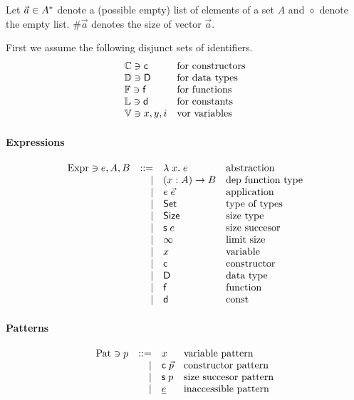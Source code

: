 Let $\vec{a} \in {A}^{\ast} $ denote a (possible empty) list of elements of a set $A$
and $\diamond$ denote the empty list. $\#\vec{a}$ denotes the size of vector $\vec{a}$.

First we assume the following disjunct sets of identifiers.
\[
\begin{array}{ll}
\mathbb{C} \ni \mathsf{c} & \mbox{for constructors}\\
\mathbb{D} \ni \mathsf{D} & \mbox{for data types}\\
\mathbb{F} \ni \mathsf{f} & \mbox{for functions}\\
\mathbb{L} \ni \mathsf{d} & \mbox{for constants}\\
\mathbb{V} \ni x,y,i & \mbox{vor variables}
\end{array}
\]

\paragraph*{Expressions}
\[
\begin{array}{lrll}
\mathrm{Expr} \ni e,A,B & ::= & \lambda\; x .\;{e} & \mbox{abstraction}\\
& \mid & ( x : A ) \rightarrow{B} & \mbox{dep function type}\\
& \mid & e \; \vec{e} & \mbox{application}\\
& \mid & \mathsf{Set} & \mbox{type of types}\\
& \mid & \mathsf{Size} & \mbox{size type} \\
& \mid & \mathsf{s}\; e  & \mbox{size succesor}\\ 
& \mid & \infty & \mbox{limit size}\\
& \mid & x & \mbox{variable}\\
& \mid & \mathsf{c} & \mbox{constructor}\\
& \mid & \mathsf{D} & \mbox{data type}\\
& \mid & \mathsf{f} & \mbox{function}\\
& \mid & \mathsf{d} & \mbox{const}
\end{array}
\]

\paragraph*{Patterns}
\[
\begin{array}{lrll}
\mathrm{Pat} \ni p & ::= & x & \mbox{variable pattern}\\
& \mid & \mathsf{c} \; \vec{p} & \mbox{constructor pattern}\\
& \mid & \mathsf{s}\; p & \mbox{size succesor pattern}\\
& \mid & \underline{e} & \mbox{inaccessible pattern}\\
\end{array}
\]

